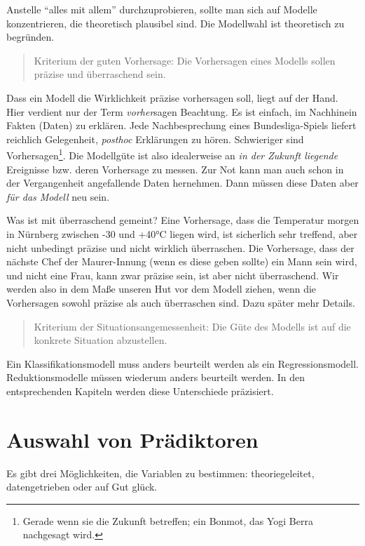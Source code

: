 \documentclass[12pt,]{book}
\begin{document}
Anstelle ``alles mit allem'' durchzuprobieren, sollte man sich auf
Modelle konzentrieren, die theoretisch plausibel sind. Die Modellwahl
ist theoretisch zu begründen.

\begin{quote}
Kriterium der guten Vorhersage: Die Vorhersagen eines Modells sollen
präzise und überraschend sein.
\end{quote}

Dass ein Modell die Wirklichkeit präzise vorhersagen soll, liegt auf der
Hand. Hier verdient nur der Term \emph{vorher}sagen Beachtung. Es ist
einfach, im Nachhinein Fakten (Daten) zu erklären. Jede Nachbesprechung
eines Bundesliga-Spiels liefert reichlich Gelegenheit, \emph{posthoc}
Erklärungen zu hören. Schwieriger sind Vorhersagen\footnote{Gerade wenn
  sie die Zukunft betreffen; ein Bonmot, das Yogi Berra nachgesagt wird.}.
Die Modellgüte ist also idealerweise an \emph{in der Zukunft liegende}
Ereignisse bzw. deren Vorhersage zu messen. Zur Not kann man auch schon
in der Vergangenheit angefallende Daten hernehmen. Dann müssen diese
Daten aber \emph{für das Modell} neu sein.

Was ist mit überraschend gemeint? Eine Vorhersage, dass die Temperatur
morgen in Nürnberg zwischen -30 und +40°C liegen wird, ist sicherlich
sehr treffend, aber nicht unbedingt präzise und nicht wirklich
überraschen. Die Vorhersage, dass der nächste Chef der Maurer-Innung
(wenn es diese geben sollte) ein Mann sein wird, und nicht eine Frau,
kann zwar präzise sein, ist aber nicht überraschend. Wir werden also in
dem Maße unseren Hut vor dem Modell ziehen, wenn die Vorhersagen sowohl
präzise als auch überraschen sind. Dazu später mehr Details.

\begin{quote}
Kriterium der Situationsangemessenheit: Die Güte des Modells ist auf die
konkrete Situation abzustellen.
\end{quote}

Ein Klassifikationsmodell muss anders beurteilt werden als ein
Regressionsmodell. Reduktionsmodelle müssen wiederum anders beurteilt
werden. In den entsprechenden Kapiteln werden diese Unterschiede
präzisiert.

\section{Auswahl von Prädiktoren}\label{auswahl-von-pradiktoren}

Es gibt drei Möglichkeiten, die Variablen zu bestimmen: theoriegeleitet,
datengetrieben oder auf Gut glück.
\end{document}
